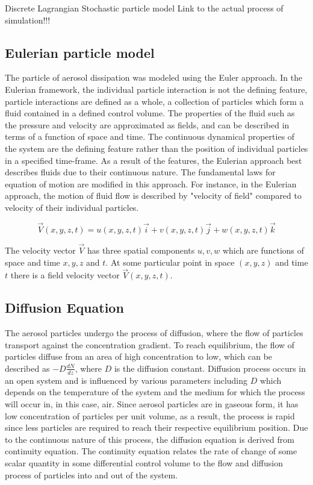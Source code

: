 \documentclass[11pt]{report}
\begin{document}
Discrete Lagrangian Stochastic particle model
Link to the actual process of simulation!!!


\subsection{Eulerian particle model}

The particle of aerosol dissipation was modeled using the Euler approach. In the Eulerian framework, the individual particle interaction is not the defining feature, particle interactions are defined as a whole, a collection of particles which form a fluid contained in a defined control volume. The properties of the fluid such as the pressure and velocity are approximated as fields, and can be described in terms of a function of space and time. The continuous dynamical properties of the system are the defining feature rather than the position of individual particles in a specified time-frame. As a result of the features, the Eulerian approach best describes fluids due to their continuous nature. The fundamental laws for equation of motion are modified in this approach. For instance, in the Eulerian approach, the motion of fluid flow is described by "velocity of field" compared to velocity of their individual particles. 

\begin{equation}
    \Vec{V}(x,y,z,t) = u(x,y,z,t)\Vec{i}+ v(x,y,z,t)\Vec{j} + w(x,y,z,t)\Vec{k}
\end{equation}

The velocity vector $\Vec{V}$ has three spatial components $u,v,w$ which are functions of space and time $x,y,z$ and $t$. At some particular point in space $(x,y,z)$ and time $t$ there is a field velocity vector $ \Vec{V}(x,y,z,t) $. 

\subsection{Diffusion Equation}

The aerosol particles undergo the process of diffusion, where the flow of particles transport against the concentration gradient. To reach equilibrium, the flow of particles diffuse from an area of high concentration to low, which can be described as $-D \frac{dN}{dz}$, where $D$ is the diffusion constant. Diffusion process occurs in an open system and is influenced by various parameters including $D$ which depends on the temperature of the system and the medium for which the process will occur in, in this case, air. Since aerosol particles are in gaseous form, it has low concentration of particles per unit volume, as a result, the process is rapid since less particles are required to reach their respective equilibrium position. Due to the continuous nature of this process, the diffusion equation is derived from continuity equation. The continuity equation relates the rate of change of some scalar quantity in some differential control volume to the flow and diffusion process of particles into and out of the system.
\end{document}
